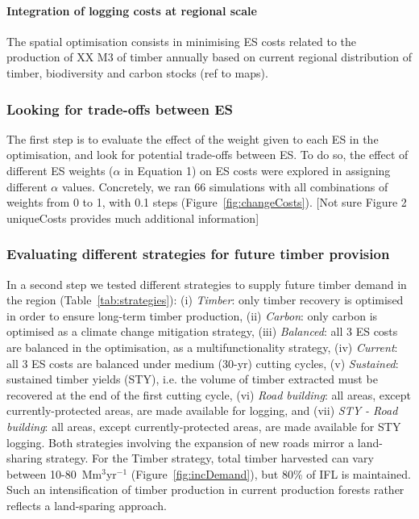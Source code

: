 \documentclass{article}
\begin{document}
\paragraph{Integration of logging costs at regional scale}

The spatial optimisation consists in  minimising ES costs related to the production of XX M3 of timber annually based on current regional distribution of timber, biodiversity and carbon stocks (ref to maps). 

\subsubsection{Looking for trade-offs between ES}

The first step is to evaluate the effect of the weight given to each ES in the optimisation, and look for potential trade-offs between ES. To do so, the effect of different ES weights ($\alpha$ in Equation 1) on ES costs were explored in assigning different $\alpha$ values. Concretely, we ran 66 simulations with all combinations of weights from 0 to 1, with 0.1 steps (Figure~\ref{fig:changeCosts}). [Not sure Figure 2 uniqueCosts provides much additional information]

\subsubsection{Evaluating different strategies for future timber provision}
\label{sec:strategies}

In a second step we tested different strategies to supply future timber demand in the region (Table~\ref{tab:strategies}): (i) \textit{Timber}: only timber recovery is optimised in order to ensure long-term timber production, (ii) \textit{Carbon}: only carbon is optimised as a climate change mitigation strategy, (iii) \textit{Balanced}: all 3 ES costs are balanced in the optimisation, as a multifunctionality strategy, (iv) \textit{Current}: all 3 ES costs are balanced under medium (30-yr) cutting cycles, (v) \textit{Sustained}: sustained timber yields (STY), i.e. the volume of timber extracted must be recovered at the end of the first cutting cycle, (vi) \textit{Road building}: all areas, except currently-protected areas, are made available for logging, and (vii) \textit{STY - Road building}: all areas, except currently-protected areas, are made available for STY logging. Both strategies involving the expansion of new roads mirror a land-sharing strategy. For the Timber strategy, total timber harvested can vary between 10-80~Mm$^3$yr$^{-1}$ (Figure~\ref{fig:incDemand}), but 80\% of IFL is maintained. Such an intensification of timber production in current production forests rather reflects a land-sparing approach.
\end{document}
